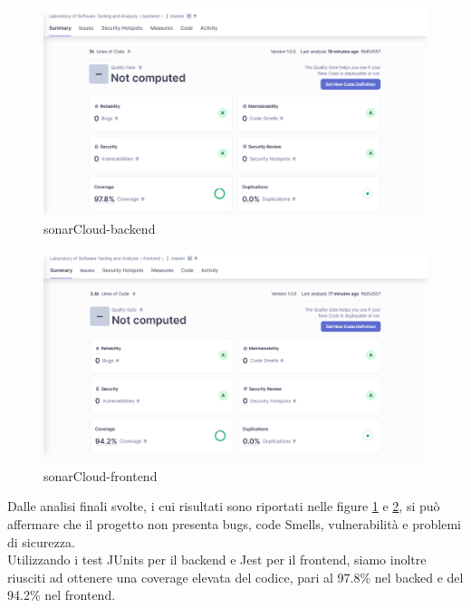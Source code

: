 \documentclass[a4paper,12pt]{report}
\begin{document}
		\begin{figure}[!h]
			\centering
			\includegraphics[width=1\linewidth]{image/sonarCloud-backend.png}
			\caption{sonarCloud-backend}\label{fig:sonarCloud-backend}
		\end{figure}	
		\begin{figure}[!h]
			\centering
			\includegraphics[width=1\linewidth]{image/sonarCloud-frontend.png}
			\caption{sonarCloud-frontend}\label{fig:sonarCloud-frontend}
		\end{figure}
		\newpage 
Dalle analisi finali svolte, i cui risultati sono riportati nelle figure \ref{fig:sonarCloud-backend} e \ref{fig:sonarCloud-frontend}, si può affermare che il progetto non presenta bugs, code Smells, vulnerabilità e problemi di sicurezza.\\
Utilizzando i test JUnits per il backend e Jest per il frontend, siamo inoltre riusciti ad ottenere una coverage elevata del codice, pari al 97.8\% nel backed e del 94.2\% nel frontend.


\newpage
\end{document}
